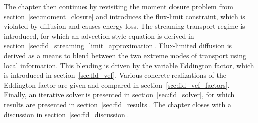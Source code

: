 The chapter then continues by revisiting the moment closure problem from section~\ref{sec:moment_closure} and introduces the flux-limit constraint, which is violated by diffusion and causes energy loss. The streaming transport regime is introduced, for which an advection style equation is derived in section~\ref{sec:fld_streaming_limit_approximation}. Flux-limited diffusion is derived as a means to blend between the two extreme modes of transport using local information. This blending is driven by the variable Eddington factor, which is introduced in section~\ref{sec:fld_vef}. Various concrete realizations of the Eddington factor are given and compared in section~\ref{sec:fld_vef_factors}. Finally, an iterative solver is presented in section~\ref{sec:fld_solver}, for which results are presented in section~\ref{sec:fld_results}. The chapter closes with a discussion in section~\ref{sec:fld_discussion}.



















